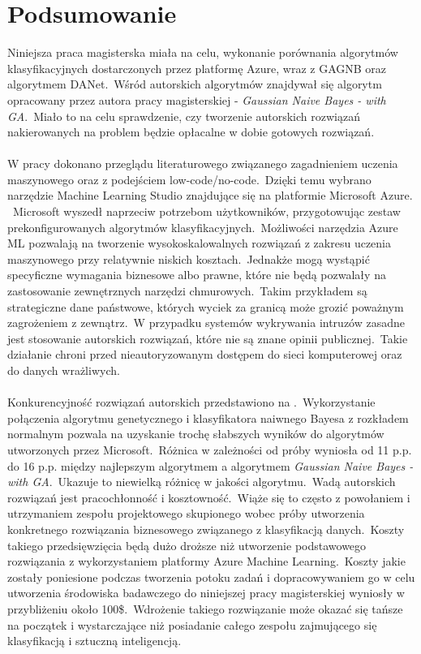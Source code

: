 \chapter{Podsumowanie}
Niniejsza praca magisterska miała na celu, wykonanie porównania algorytmów klasyfikacyjnych dostarczonych przez platformę Azure, wraz z GAGNB oraz algorytmem DANet.\ Wśród autorskich algorytmów znajdywał się algorytm opracowany przez autora pracy magisterskiej - \textit{Gaussian Naive Bayes - with GA}.\ Miało to na celu sprawdzenie, czy tworzenie autorskich rozwiązań nakierowanych na problem będzie opłacalne w dobie gotowych rozwiązań.
\\ \\
W pracy dokonano przeglądu literaturowego związanego zagadnieniem uczenia maszynowego oraz z podejściem low-code/no-code.\ Dzięki temu wybrano narzędzie Machine Learning Studio znajdujące się na platformie Microsoft Azure. \ Microsoft wyszedł naprzeciw potrzebom użytkowników, przygotowując zestaw prekonfigurowanych algorytmów klasyfikacyjnych.\ Możliwości narzędzia Azure ML pozwalają na tworzenie wysokoskalowalnych rozwiązań z zakresu uczenia maszynowego przy relatywnie niskich kosztach.\ Jednakże mogą wystąpić specyficzne wymagania biznesowe albo prawne, które nie będą pozwalały na zastosowanie zewnętrznych narzędzi chmurowych.\ Takim przykładem są strategiczne dane państwowe, których wyciek za granicą może grozić poważnym zagrożeniem z zewnątrz.\ W przypadku systemów wykrywania intruzów zasadne jest stosowanie autorskich rozwiązań, które nie są znane opinii publicznej.\ Takie działanie chroni przed nieautoryzowanym dostępem do sieci komputerowej oraz do danych wrażliwych.
\\ \\
Konkurencyjność rozwiązań autorskich przedstawiono na .\ Wykorzystanie połączenia algorytmu genetycznego i klasyfikatora naiwnego Bayesa z rozkładem normalnym pozwala na uzyskanie trochę słabszych wyników do algorytmów utworzonych przez Microsoft.\ Różnica w zależności od próby wyniosła od 11 p.p. do 16 p.p. między najlepszym algorytmem a algorytmem \textit{Gaussian Naive Bayes - with GA}.\ Ukazuje to niewielką różnicę w jakości algorytmu.\ Wadą autorskich rozwiązań jest pracochłonność i kosztowność.\ Wiąże się to często z powołaniem i utrzymaniem zespołu projektowego skupionego wobec próby utworzenia konkretnego rozwiązania biznesowego związanego z klasyfikacją danych.\ Koszty takiego przedsięwzięcia będą dużo droższe niż utworzenie podstawowego rozwiązania z wykorzystaniem platformy Azure Machine Learning.\ Koszty jakie zostały poniesione podczas tworzenia potoku zadań i dopracowywaniem go w celu utworzenia środowiska badawczego do niniejszej pracy magisterskiej wyniosły w przybliżeniu około 100\$.\ Wdrożenie takiego rozwiązanie może okazać się tańsze na początek i wystarczające niż posiadanie całego zespołu zajmującego się klasyfikacją i sztuczną inteligencją.
